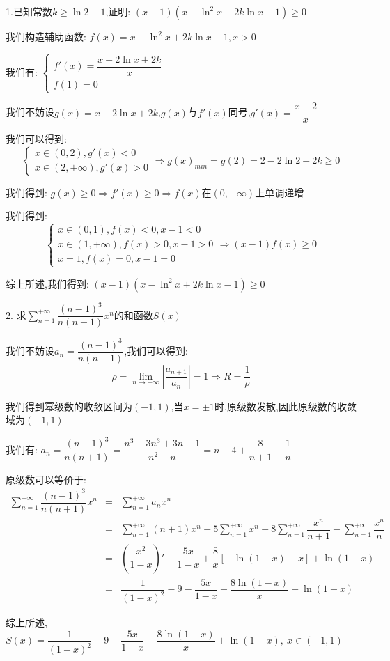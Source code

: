 1.已知常数$k\geq \ln2-1$,证明:  $(x-1)(x-\ln^2 x+2k\ln x-1)\geq 0$
\begin{solution}

	我们构造辅助函数:  $f(x)=x-\ln^2 x+2k\ln x-1,x>0$
	
	我们有:  $\left\lbrace
	\begin{array}{l}
		f'(x)=\dfrac{x-2\ln x+2k}{x}\\
		f(1)=0
	\end{array}
	\right. $
	
	我们不妨设$g(x)=x-2\ln x+2k$,$g(x)$与$f'(x)$同号,$g'(x)=\dfrac{x-2}{x}$
	
	我们可以得到:  $$\left\lbrace
	\begin{array}{l}
		x\in(0,2),g'(x)<0\\
		x\in(2,+\infty),g'(x)>0
	\end{array}
	\right. \Rightarrow g(x)_{min}=g(2)=2-2\ln2+2k\geq 0$$
	
	我们得到:  $g(x)\geq 0\Rightarrow f'(x)\geq 0\Rightarrow f(x)\text{在}(0,+\infty)\text{上单调递增}$
	
	我们得到:  
	$$\left\lbrace
	\begin{array}{l}
		x\in(0,1),f(x)<0,x-1<0\\
		x\in(1,+\infty),f(x)>0,x-1>0\\
		x=1,f(x)=0,x-1=0
	\end{array}
	\right. \Rightarrow (x-1)f(x)\geq 0$$
	
	综上所述,我们得到:  $(x-1)(x-\ln^2 x+2k\ln x-1)\geq 0$
\end{solution}

2. 求$\sum\limits_{n=1}^{+\infty}\dfrac{(n-1)^3}{n(n+1)}x^n$的和函数$S(x)$
\begin{solution}

	我们不妨设$a_{n}=\dfrac{(n-1)^3}{n(n+1)}$,我们可以得到:  
	$$\rho=\lim\limits_{n\to+\infty}|\dfrac{a_{n+1}}{a_{n}}|=1\Rightarrow R=\dfrac{1}{\rho}$$
	
	我们得到幂级数的收敛区间为$(-1,1)$,当$x=\pm 1$时,原级数发散,因此原级数的收敛域为$(-1,1)$
	
	我们有:  $a_{n}=\dfrac{(n-1)^3}{n(n+1)}=\dfrac{n^3-3n^3+3n-1}{n^2+n}=n-4+\dfrac{8}{n+1}-\dfrac{1}{n}$
	
	原级数可以等价于:  
	\begin{eqnarray*}
		\sum\limits_{n=1}^{+\infty}\dfrac{(n-1)^3}{n(n+1)}x^n&=&\sum\limits_{n=1}^{+\infty}a_{n}x^n\\
		&=&\sum\limits_{n=1}^{+\infty}(n+1)x^n-5\sum\limits_{n=1}^{+\infty}x^n+8\sum\limits_{n=1}^{+\infty}\dfrac{x^n}{n+1}-\sum\limits_{n=1}^{+\infty}\dfrac{x^n}{n}\\
		&=&(\dfrac{x^2}{1-x})'-\dfrac{5x}{1-x}+\dfrac{8}{x}[-\ln(1-x)-x]+\ln(1-x)\\
		&=&\dfrac{1}{(1-x)^2}-9-\dfrac{5x}{1-x}-\dfrac{8\ln(1-x)}{x}+\ln(1-x)
	\end{eqnarray*}

综上所述,$S(x)=\dfrac{1}{(1-x)^2}-9-\dfrac{5x}{1-x}-\dfrac{8\ln(1-x)}{x}+\ln(1-x), \ x\in(-1,1)$
\end{solution}

